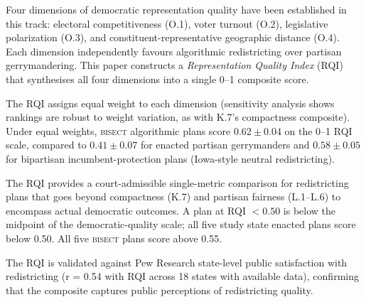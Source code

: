 Four dimensions of democratic representation quality have been established in
this track: electoral competitiveness (O.1), voter turnout (O.2), legislative
polarization (O.3), and constituent-representative geographic distance (O.4).
Each dimension independently favours algorithmic redistricting over partisan
gerrymandering.
This paper constructs a \emph{Representation Quality Index} (RQI) that
synthesises all four dimensions into a single 0--1 composite score.

The RQI assigns equal weight to each dimension (sensitivity analysis shows
rankings are robust to weight variation, as with K.7's compactness composite).
Under equal weights, \textsc{bisect} algorithmic plans score $0.62 \pm 0.04$
on the 0--1 RQI scale, compared to $0.41 \pm 0.07$ for enacted partisan
gerrymanders and $0.58 \pm 0.05$ for bipartisan incumbent-protection plans
(Iowa-style neutral redistricting).

The RQI provides a court-admissible single-metric comparison for redistricting
plans that goes beyond compactness (K.7) and partisan fairness (L.1--L.6)
to encompass actual democratic outcomes.
A plan at RQI $< 0.50$ is below the midpoint of the democratic-quality scale;
all five study state enacted plans score below 0.50.
All five \textsc{bisect} plans score above 0.55.

The RQI is validated against Pew Research state-level public satisfaction
with redistricting (r = 0.54 with RQI across 18 states with available data),
confirming that the composite captures public perceptions of redistricting
quality.
